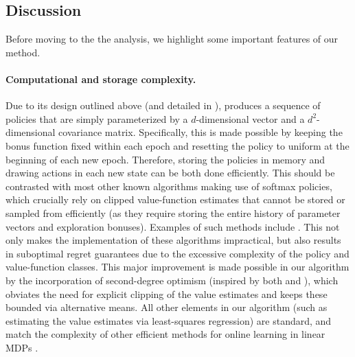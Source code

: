 \subsection{Discussion}

Before moving to the the analysis, we highlight some important features of our method.

\paragraph{Computational and storage complexity.} Due to its design outlined above (and detailed in ), \algname produces a sequence of policies that are simply parameterized by a $d$-dimensional vector and a $d^2$-dimensional covariance matrix. Specifically, this is made possible by keeping the bonus function fixed within each epoch and resetting the policy to uniform at the beginning of each new epoch. Therefore, storing the policies in memory and drawing actions in each new state can be both done efficiently. This should be contrasted with most other known algorithms making use of softmax policies, which crucially rely on clipped value-function estimates that cannot be stored or sampled from efficiently (as they require storing the entire history of parameter vectors and exploration bonuses). Examples of such methods include \cite{Cai:2020,zhong2024theoretical,sherman2023,MN23}. This not only makes the implementation of these algorithms impractical, but also results in suboptimal regret guarantees due to the excessive complexity of the policy and value-function classes. This major improvement is made possible in our algorithm by the incorporation of second-degree optimism (inspired by both \citealp{brafman2002r} and \citealp{cassel2024warmupfree}), which obviates the need for explicit clipping of the value estimates and keeps these bounded via alternative means. All other elements in our algorithm (such as estimating the value estimates via least-squares regression) are standard, and match the complexity of other efficient methods for online learning in linear MDPs \cite{jin2019provably,wang2021provably,he2023nearly}.

